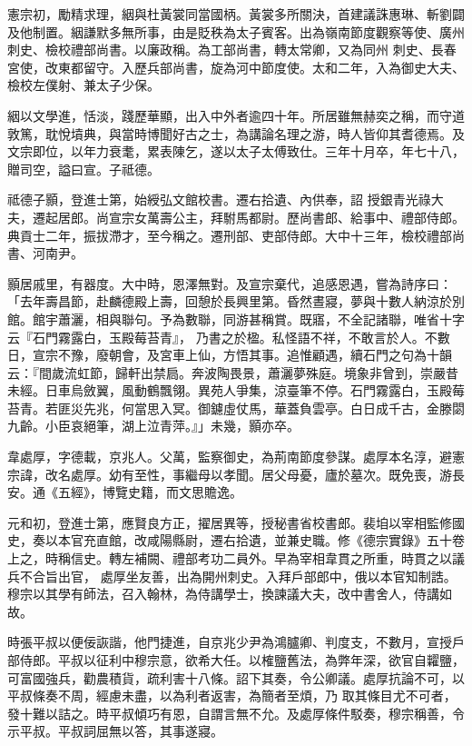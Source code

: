 \begin{pinyinscope}
 憲宗初，勵精求理，絪與杜黃裳同當國柄。黃裳多所關決，首建議誅惠琳、斬劉闢及他制置。絪謙默多無所事，由是貶秩為太子賓客。出為嶺南節度觀察等使、廣州刺史、檢校禮部尚書。以廉政稱。為工部尚書，轉太常卿，又為同州
 刺史、長春宮使，改東都留守。入歷兵部尚書，旋為河中節度使。太和二年，入為御史大夫、檢校左僕射、兼太子少保。



 絪以文學進，恬淡，踐歷華顯，出入中外者逾四十年。所居雖無赫奕之稱，而守道敦篤，耽悅墳典，與當時博聞好古之士，為講論名理之游，時人皆仰其耆德焉。及文宗即位，以年力衰耄，累表陳乞，遂以太子太傅致仕。三年十月卒，年七十八，贈司空，謚曰宣。子祗德。



 祗德子顥，登進士第，始綬弘文館校書。遷右拾遺、內供奉，詔
 授銀青光祿大夫，遷起居郎。尚宣宗女萬壽公主，拜駙馬都尉。歷尚書郎、給事中、禮部侍郎。典貢士二年，振拔滯才，至今稱之。遷刑部、吏部侍郎。大中十三年，檢校禮部尚書、河南尹。



 顥居戚里，有器度。大中時，恩澤無對。及宣宗棄代，追感恩遇，嘗為詩序曰：「去年壽昌節，赴麟德殿上壽，回憩於長興里第。昏然晝寢，夢與十數人納涼於別館。館宇蕭灑，相與聯句。予為數聯，同游甚稱賞。既寤，不全記諸聯，唯省十字云『石門霧露白，玉殿莓苔青』，
 乃書之於楹。私怪語不祥，不敢言於人。不數日，宣宗不豫，廢朝會，及宮車上仙，方悟其事。追惟顧遇，續石門之句為十韻云：『間歲流虹節，歸軒出禁扃。奔波陶畏景，蕭灑夢殊庭。境象非曾到，崇嚴昔未經。日車烏斂翼，風動鶴飄翎。異苑人爭集，涼臺筆不停。石門霧露白，玉殿莓苔青。若匪災先兆，何當思入冥。御鑢虛仗馬，華蓋負雲亭。白日成千古，金滕閟九齡。小臣哀絕筆，湖上泣青萍。』」未幾，顥亦卒。



 韋處厚，字德載，京兆人。父萬，監察御史，為荊南節度參謀。處厚本名淳，避憲宗諱，改名處厚。幼有至性，事繼母以孝聞。居父母憂，廬於墓次。既免喪，游長安。通《五經》，博覽史籍，而文思贍逸。



 元和初，登進士第，應賢良方正，擢居異等，授秘書省校書郎。裴垍以宰相監修國史，奏以本官充直館，改咸陽縣尉，遷右拾遺，並兼史職。修《德宗實錄》五十卷上之，時稱信史。轉左補闕、禮部考功二員外。早為宰相韋貫之所重，時貫之以議兵不合旨出官，
 處厚坐友善，出為開州刺史。入拜戶部郎中，俄以本官知制誥。穆宗以其學有師法，召入翰林，為侍講學士，換諫議大夫，改中書舍人，侍講如故。



 時張平叔以便佞詼諧，他門捷進，自京兆少尹為鴻臚卿、判度支，不數月，宣授戶部侍郎。平叔以征利中穆宗意，欲希大任。以榷鹽舊法，為弊年深，欲官自糶鹽，可富國強兵，勸農積貨，疏利害十八條。詔下其奏，令公卿議。處厚抗論不可，以平叔條奏不周，經慮未盡，以為利者返害，為簡者至煩，乃
 取其條目尤不可者，發十難以詰之。時平叔傾巧有恩，自謂言無不允。及處厚條件駁奏，穆宗稱善，令示平叔。平叔詞屈無以答，其事遂寢。




\end{pinyinscope}
